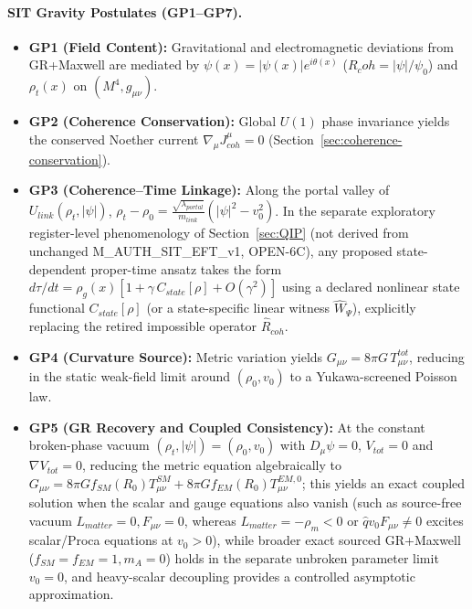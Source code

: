\documentclass[american,11pt,letterpaper]{article}
\newcommand{\Rcoh}{R_{\mathrm{coh}}}
\def\mathcal#1{#1}%
\def\mathrm#1{#1}%
\def\texttt#1{#1}%
\def\emph#1{#1}%
\def\Rcoh{R_coh}%
\begin{document}
\paragraph{SIT Gravity Postulates (GP1--GP7).}
\begin{itemize}
  \item \textbf{GP1 (Field Content):} Gravitational and electromagnetic deviations from GR+Maxwell are mediated by $\psi(x) = |\psi(x)|e^{i\theta(x)}$ ($\Rcoh = |\psi|/\psi_0$) and $\rho_t(x)$ on $(\mathcal{M}^4, g_{\mu\nu})$.
  \item \textbf{GP2 (Coherence Conservation):} Global $U(1)$ phase invariance yields the conserved Noether current $\nabla_\mu J^\mu_{\mathrm{coh}} = 0$ (Section~\ref{sec:coherence-conservation}).
  \item \textbf{GP3 (Coherence--Time Linkage):} Along the portal valley of $U_{\mathrm{link}}(\rho_t, |\psi|)$, $\rho_t - \rho_0 = \frac{\sqrt{\lambda_{\mathrm{portal}}}}{m_{\mathrm{link}}}(|\psi|^2 - v_0^2)$. In the separate exploratory register-level phenomenology of Section~\ref{sec:QIP} (not derived from unchanged \texttt{M\_AUTH\_SIT\_EFT\_v1}, \texttt{OPEN-6C}), any proposed state-dependent proper-time ansatz takes the form $d\tau/dt = \rho_g(x)[1 + \gamma\,\mathcal{C}_{\mathrm{state}}[\rho] + O(\gamma^2)]$ using a declared \emph{nonlinear} state functional $\mathcal{C}_{\mathrm{state}}[\rho]$ (or a state-specific linear witness $\hat{W}_\Psi$), explicitly replacing the retired impossible operator $\hat{\mathcal{R}}_{\mathrm{coh}}$.
  \item \textbf{GP4 (Curvature Source):} Metric variation yields $G_{\mu\nu} = 8\pi G\,T_{\mu\nu}^{\mathrm{tot}}$, reducing in the static weak-field limit around $(\rho_0, v_0)$ to a Yukawa-screened Poisson law.
  \item \textbf{GP5 (GR Recovery and Coupled Consistency):} At the constant broken-phase vacuum $(\rho_t, |\psi|) = (\rho_0, v_0)$ with $D_\mu\psi = 0$, $V_{\mathrm{tot}} = 0$ and $\nabla V_{\mathrm{tot}} = 0$, reducing the metric equation \emph{algebraically} to $G_{\mu\nu} = 8\pi G f_{\mathrm{SM}}(R_0) T_{\mu\nu}^{\mathrm{SM}} + 8\pi G f_{\mathrm{EM}}(R_0) T_{\mu\nu}^{\mathrm{EM},0}$; this yields an exact coupled solution when the scalar and gauge equations also vanish (such as source-free vacuum $\mathcal{L}_{\mathrm{matter}} = 0, F_{\mu\nu} = 0$, whereas $\mathcal{L}_{\mathrm{matter}} = -\rho_m < 0$ or $\hat{q}v_0 F_{\mu\nu} \ne 0$ excites scalar/Proca equations at $v_0 > 0$), while broader exact sourced GR+Maxwell ($f_{\mathrm{SM}} = f_{\mathrm{EM}} = 1, m_A = 0$) holds in the separate unbroken parameter limit $v_0 = 0$, and heavy-scalar decoupling provides a controlled asymptotic approximation.

\end{itemize}
\end{document}
